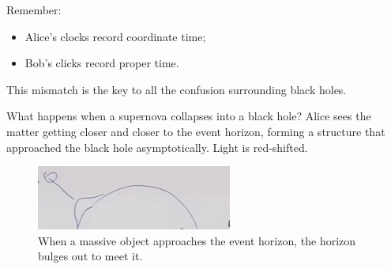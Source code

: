\documentclass[]{article}
\begin{document}
{Remember:
\begin{itemize}
	\item Alice's clocks record coordinate time;
	\item Bob's clicks record proper time.
\end{itemize}

This mismatch is the key to all the confusion surrounding black holes.

What happens when a supernova collapses into a black hole? Alice sees the matter getting closer and closer to the event horizon, forming a structure that approached the black hole asymptotically. Light is red-shifted.

\begin{figure}[H]
	\caption[A massive object approaching the event horizon]{When a massive object approaches the event horizon, the horizon bulges out to meet it.}\label{fig:gr-6-massive-object}
	\includegraphics{gr-6-massive-object}
\end{figure}

}
\end{document}
